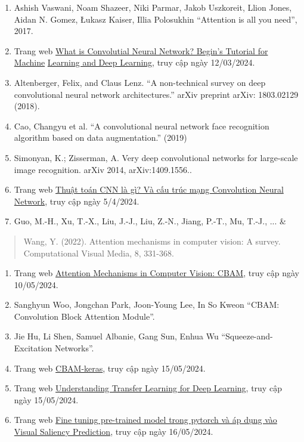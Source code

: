 \documentclass[
]{article}
\begin{document}
\begin{enumerate}
\def\labelenumi{\arabic{enumi}.}
\item
  Ashish Vaswani, Noam Shazeer, Niki Parmar, Jakob Uszkoreit, Llion
  Jones, Aidan N. Gomez, Łukasz Kaiser, Illia Polosukhin ``Attention is
  all you need'', 2017.
\item
  Trang web \uline{What is Convolutial Neural Network? Begin's Tutorial
  for Machine} \uline{Learning and Deep Learning}, truy cập ngày
  12/03/2024.
\item
  Altenberger, Felix, and Claus Lenz. ``A non-technical survey on deep
  convolutional neural network architectures.'' arXiv preprint arXiv:
  1803.02129 (2018).
\item
  Cao, Changyu et al. ``A convolutional neural network face recognition
  algorithm based on data augmentation.'' (2019)
\item
  Simonyan, K.; Zisserman, A. Very deep convolutional networks for
  large-scale image recognition. arXiv 2014, arXiv:1409.1556..
\item
  Trang web \uline{Thuật toán CNN là gì? Và cấu trúc mạng Convolution
  Neural} \uline{Network}, truy cập ngày 5/4/2024.
\item
  Guo, M.-H., Xu, T.-X., Liu, J.-J., Liu, Z.-N., Jiang, P.-T., Mu,
  T.-J., ... \&
\end{enumerate}

\begin{quote}
Wang, Y. (2022). Attention mechanisms in computer vision: A survey.
Computational Visual Media, 8, 331-368.
\end{quote}

\begin{enumerate}
\def\labelenumi{\arabic{enumi}.}
\setcounter{enumi}{7}
\item
  Trang web \uline{Attention Mechanisms in Computer Vision: CBAM}, truy
  cập ngày 10/05/2024.
\item
  Sanghyun Woo, Jongchan Park, Joon-Young Lee, In So Kweon ``CBAM:
  Convolution Block Attention Module''.
\item
  Jie Hu, Li Shen, Samuel Albanie, Gang Sun, Enhua Wu
  ``Squeeze-and-Excitation Networks''.
\item
  Trang web \uline{CBAM-keras}, truy cập ngày 15/05/2024.
\item
  Trang web \uline{Understanding Transfer Learning for Deep Learning},
  truy cập ngày 15/05/2024.
\item
  Trang web \uline{Fine tuning pre-trained model trong pytorch và áp
  dụng vào} \uline{Visual Saliency Prediction}, truy cập ngày
  16/05/2024.
\end{enumerate}
\end{document}
